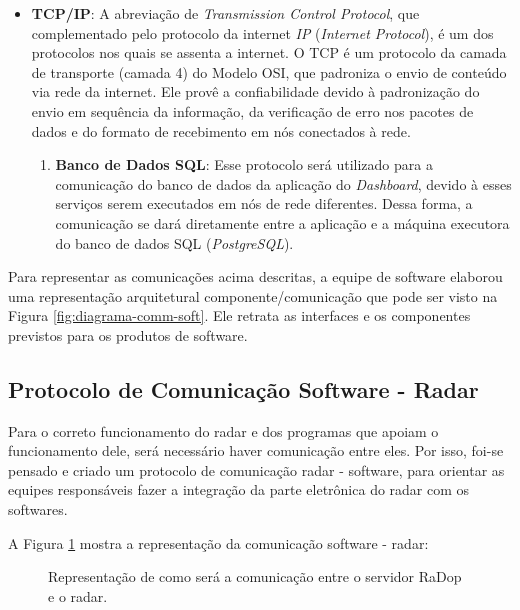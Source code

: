 \begin{itemize}
    \item \textbf{TCP/IP}:
    A abreviação de \textit{Transmission Control Protocol}, que complementado pelo protocolo da internet \textit{IP} (\textit{Internet Protocol}), é um dos protocolos nos quais se assenta a internet. O TCP é um protocolo da camada de transporte (camada 4) do Modelo OSI, que padroniza o envio de conteúdo via rede da internet. Ele provê a confiabilidade devido à padronização do envio em sequência da informação, da verificação de erro nos pacotes de dados e do formato de recebimento em nós conectados à rede.
    \begin{enumerate}
        \item \textbf{Banco de Dados SQL}: Esse protocolo será utilizado para a comunicação do banco de dados da aplicação do \textit{Dashboard}, devido à esses serviços serem executados em nós de rede diferentes. Dessa forma, a comunicação se dará diretamente entre a aplicação e a máquina executora do banco de dados SQL (\textit{PostgreSQL}).
    \end{enumerate}
\end{itemize}

Para representar as comunicações acima descritas, a equipe de software elaborou uma representação arquitetural componente/comunicação que pode ser visto na Figura \ref{fig:diagrama-comm-soft}. Ele retrata as interfaces e os componentes previstos para os produtos de software.

\subsection{Protocolo de Comunicação Software - Radar}

Para o correto funcionamento do radar e dos programas que apoiam o funcionamento dele, será necessário haver comunicação entre eles. Por isso, foi-se pensado e criado um protocolo de comunicação radar - software, para orientar as equipes responsáveis fazer a integração da parte eletrônica do radar com os softwares.

A Figura \ref{fig:diagrama-com-soft-radar} mostra a representação da comunicação software - radar:

\begin{figure}[ht]
	\caption{\label{fig:diagrama-com-soft-radar} Representação de como será a comunicação entre o servidor RaDop e o radar.}
\end{figure}


